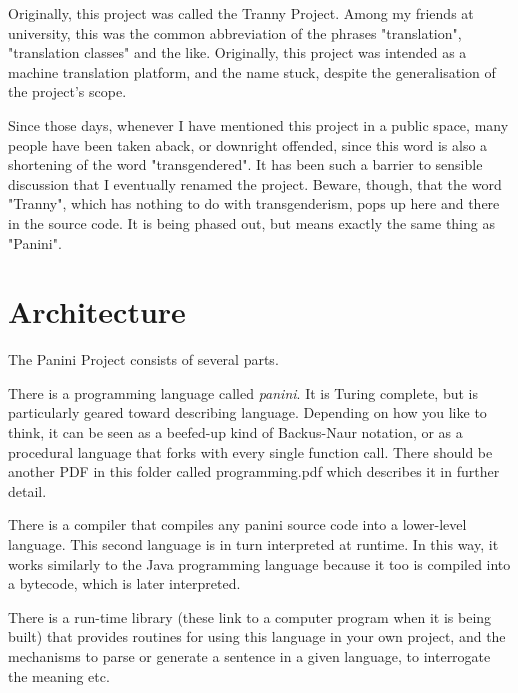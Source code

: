 \documentclass{article}
\begin{document}
Originally, this project was called the Tranny Project. Among my friends at university, this was the common abbreviation of the 
phrases "translation", "translation classes" and the like. Originally, this project was intended as a machine translation platform,
and the name stuck, despite the generalisation of the project's scope. 

Since those days, whenever I have mentioned this project in a public space, many people have been taken aback, or downright 
offended, since this word is also a shortening of the word "transgendered". It has been such a barrier to sensible discussion that I
eventually renamed the project. Beware, though, that the word "Tranny", which has nothing to do with transgenderism, pops up here and
there in the source code. It is being phased out, but means exactly the same thing as "Panini".

\section{Architecture}
The Panini Project consists of several parts.

There is a programming language called \emph{panini}. It is Turing complete, but is particularly geared toward describing language.
Depending on how you like to think, it can be seen as a beefed-up kind of Backus-Naur notation, or as a procedural language that 
forks with every single function call. There should be another PDF in this folder called programming.pdf which describes it in 
further detail.

There is a compiler that compiles any panini source code into a lower-level language. This second language is in turn interpreted at
runtime. In this way, it works similarly to the Java programming language because it too is compiled into a bytecode, which is later
interpreted.

There is a run-time library (these link to a computer program when it is being built) that provides routines for using this language
in your own project, and the mechanisms to parse or generate a sentence in a given language, to interrogate the meaning etc.

\label{end}
\end{document}
